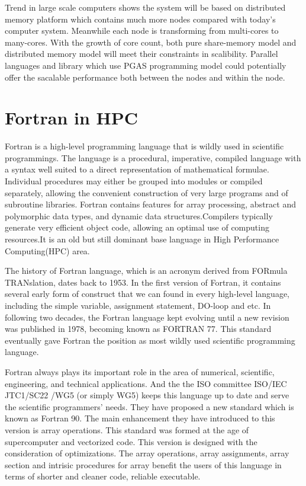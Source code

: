 Trend in large scale computers shows the system will be based on distributed memory platform which contains much more nodes compared with today's computer system. Meanwhile each node is transforming from multi-cores to many-cores. With the growth of core count, both pure share-memory model and distributed memory model will meet their constraints in scalibility. Parallel languages and library which use PGAS programming model could potentially offer the sacalable performance both between the nodes and within the node. 

\section{Fortran in HPC}

Fortran is a high-level programming language that is wildly used in scientific programmings. The language is a procedural, imperative, compiled language with a syntax well suited to a direct representation of mathematical formulae. Individual procedures may either be grouped into modules or compiled separately, allowing the convenient construction of very large programs and of subroutine libraries. Fortran contains features for array processing, abstract and polymorphic data types, and dynamic data structures.Compilers typically generate very efficient object code, allowing an optimal use of computing resources.It is an old but still dominant base language in High Performance Computing(HPC) area. 

The history\cite{fortranlanguage} of Fortran language, which is an acronym derived from FORmula TRANslation, dates back to 1953. In the first version of Fortran, it contains several early form of construct that we can found in every high-level language, including the simple variable, assignment statement, DO-loop and etc. In following two decades, the Fortran language kept evolving until a new revision was published in 1978,  becoming known as FORTRAN 77. This standard eventually gave Fortran the position as most wildly used scientific programming language. 

Fortran always plays its important role in the area of numerical, scientific, engineering, and technical applications. And the the ISO committee ISO/IEC JTC1/SC22 /WG5 (or simply WG5) keeps this language up to date and serve the scientific programmers' needs. They have proposed a new standard which is known as Fortran 90. The main enhancement they have introduced to this version is array operations. This standard was formed at the age of supercomputer and vectorized code. This version is designed with the consideration of optimizations. The array operations, array assignments, array section and intrisic procedures for array benefit the users of this language in terms of shorter and cleaner code, reliable executable.  

